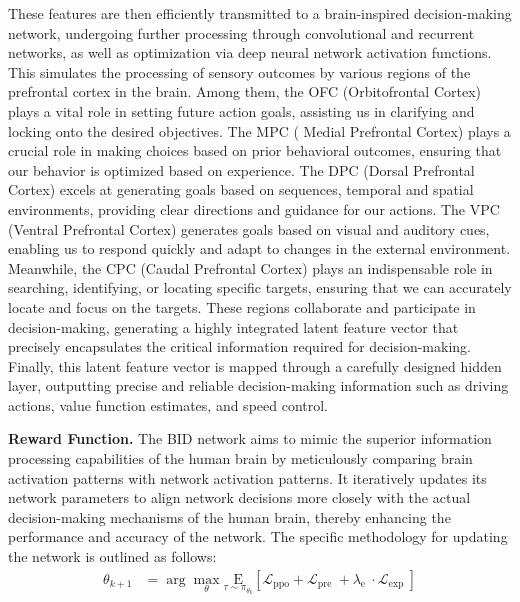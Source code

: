 These features are then efficiently transmitted to a brain-inspired decision-making network, undergoing further processing through convolutional and recurrent networks, as well as optimization via deep neural network activation functions. This simulates the processing of sensory outcomes by various regions of the prefrontal cortex in the brain. Among them, the OFC (Orbitofrontal Cortex) plays a vital role in setting future action goals, assisting us in clarifying and locking onto the desired objectives. The MPC ( Medial Prefrontal Cortex) plays a crucial role in making choices based on prior behavioral outcomes, ensuring that our behavior is optimized based on experience. The DPC (Dorsal Prefrontal Cortex) excels at generating goals based on sequences, temporal and spatial environments, providing clear directions and guidance for our actions. The VPC (Ventral Prefrontal Cortex) generates goals based on visual and auditory cues, enabling us to respond quickly and adapt to changes in the external environment.  Meanwhile, the CPC (Caudal Prefrontal Cortex) plays an indispensable role in searching, identifying, or locating specific targets, ensuring that we can accurately locate and focus on the targets.  These regions collaborate and participate in decision-making, generating a highly integrated latent feature vector that precisely encapsulates the critical information required for decision-making. Finally, this latent feature vector is mapped through a carefully designed hidden layer, outputting precise and reliable decision-making information such as driving actions, value function estimates, and speed control.

\textbf{\textsf{Reward Function.}} The BID network aims to mimic the superior information processing capabilities of the human brain by meticulously comparing brain activation patterns with network activation patterns. 
It iteratively updates its network parameters to align network decisions more closely with the actual decision-making mechanisms of the human brain, thereby enhancing the performance and accuracy of the network. 
The specific methodology for updating the network is outlined as follows:
\begin{align}
	\theta_{k+1} & = \arg \max _{\theta} \underset{\tau \sim \pi_{\theta_{k}}}{\mathrm{E}}\left[\mathcal{L}_{\mathrm{ppo}}+\mathcal{L}_{\text {pre }}+\lambda_{\text {e }} \cdot \mathcal{L}_{\text {exp }}\right]
\end{align}

